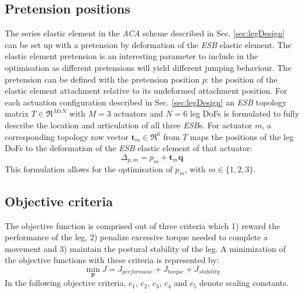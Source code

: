 \documentclass[letterpaper, 10 pt, conference]{ieeeconf}  %
\begin{document}
\subsection{Pretension positions}

The series elastic element in the \textit{ACA} scheme described in Sec. \ref{sec:legDesign} can be set up with a pretension by deformation of the \textit{ESB} elastic element. The elastic element pretension is an interesting parameter to include in the optimisation as different pretensions will yield different jumping behaviour. The pretension can be defined with the pretension position $p$: the position of the elastic element attachment relative to its undeformed attachment position. For each actuation configuration described in Sec. \ref{sec:legDesign} an \textit{ESB} topology matrix $T \in \mathfrak{R}^{M x N}$ with $M=3$ actuators and $N=6$ leg DoFs is formulated to fully describe the location and articulation of all three \textit{ESB}s. For actuator $m$, a corresponding topology row vector $\mathbf{t}_m \in \mathfrak{R}^6$ from $T$ maps the positions of the leg DoFs to the deformation of the \textit{ESB} elastic element of that actuator:
\begin{equation}
\Delta_{p,m} = p_m + \mathbf{t}_m \mathbf{q}
\end{equation}
This formulation allows for the optimisation of $p_m$, with $m \in \{1,2,3\}$.

\subsection{Objective criteria}

The objective function is comprised out of three criteria which 1) reward the performance of the leg, 2) penalize excessive torque needed to complete a movement and 3) maintain the postural stability of the leg. A minimization of the objective functions with these criteria is represented by:   
 \begin{equation}
\min_{\mathbf{p}}\limits J =  J_{performane}+ J_{torque}+ J_{stability}
 \end{equation}
In the following objective criteria, $c_1$, $c_2$, $c_3$, $c_4$ and $c_5$ denote scaling constants.\\
\end{document}
